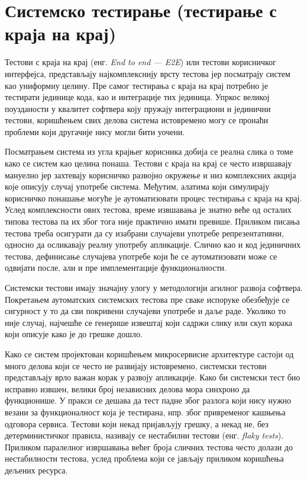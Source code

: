 \documentclass[12pt,oneside]{memoir}
\begin{document}
\section{Системско тестирање (тестирање с краја на крај)}

Тестови с краја на крај (енг.\textit{ End to end --- E2E}) или тестови корисничког интерфејса, представљају најкомплекснију врсту тестова јер посматрају систем као униформну целину. Пре самог тестирања с краја на крај потребно је тестирати јединице кода, као и интеграције тих јединица. Упркос великој поузданости у квалитет софтвера коју пружају интеграциони и јединични тестови, коришћењем свих делова система истовремено могу се пронаћи проблеми који другачије нису могли бити уочени.

Посматрањем система из угла крајњег корисника добија се реална слика о томе како се систем као целина понаша. Тестови с краја на крај се често извршавају мануелно јер захтевају корисничко развојно окружење и низ комплексних акција које описују случај употребе система. Међутим, алатима који симулирају корисничко понашање могуће је аутоматизовати процес тестирања с краја на крај. Услед комплексности ових тестова, време извшавања је знатно веће од осталих типова тестова па их због тога није практично имати превише. Приликом писања тестова треба осигурати да су изабрани случајеви употребе репрезентативни, односно да осликавају реалну употребу апликације. Слично као и код јединичних тестова, дефинисање случајева употребе који ће се аутоматизовати може се одвијати после, али и пре имплементације функционалности.

Системски тестови имају значајну улогу у методологији агилног развоја софтвера. Покретањем аутоматских системских тестова пре сваке испоруке обезбеђује се сигурност у то да сви покривени случајеви употребе и даље раде. Уколико то није случај, најчешће се генерише извештај који садржи слику или скуп корака који описује како је до грешке дошло.

Како се систем пројектован коришћењем микросервисне архитектуре састоји од много делова који се често не развијају истовремено, системски тестови представљају врло важан корак у развоју апликације. Како би системски тест био исправно извшен, велики број независних делова мора синхроно да функционише. У пракси се дешава да тест падне због разлога који нису нужно везани за функционалност која је тестирана, нпр. због привременог кашњења одговора сервиса.  Тестови који некад пријављују грешку, а некад не, без детерминистичког правила, називају се нестабилни тестови (енг. \textit{flaky tests}). Приликом паралелног извршавања већег броја сличних тестова често долази до нестабилности тестова, услед проблема који се јављају приликом коришћења дељених ресурса.
\end{document}
